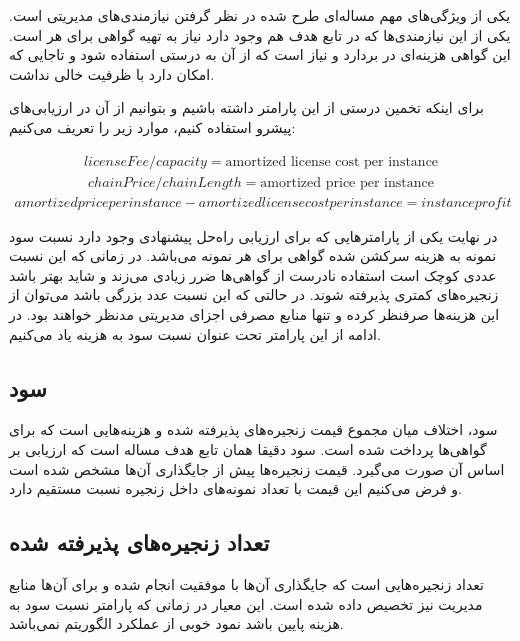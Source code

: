 یکی از ویژگی‌های مهم مساله‌ای طرح شده در نظر گرفتن نیازمندی‌های مدیریتی است. یکی از این نیازمندی‌ها که در تابع هدف هم
وجود دارد نیاز به تهیه گواهی برای هر  است.
این گواهی هزینه‌ای در بردارد و نیاز است که از آن به درستی استفاده شود
و تاجایی که امکان دارد  با ظرفیت خالی نداشت.

برای اینکه تخمین درستی از این پارامتر داشته باشیم و بتوانیم از آن در ارزیابی‌های پیشرو استفاده کنیم، موارد زیر را تعریف می‌کنیم:
    

\begin{latin}
    \begin{align}
      licenseFee / capacity = \text{amortized license cost per instance}
    \end{align}
    \begin{align}
      chainPrice / chainLength = \text{amortized price per instance}
    \end{align}
    \begin{align}
      amortized price per instance - amortized license cost per instance = instance profit 
    \end{align}
\end{latin}

در نهایت یکی از پارامترهایی که برای ارزیابی راه‌حل پیشنهادی وجود دارد
نسبت سود نمونه به هزینه سرکشن شده گواهی برای هر نمونه می‌باشد.
در زمانی که این نسبت عددی کوچک است استفاده نادرست از گواهی‌ها ضرر زیادی می‌زند و شاید بهتر باشد زنجیره‌های کمتری پذیرفته شوند.
در حالتی که این نسبت عدد بزرگی باشد می‌توان از این هزینه‌ها صرفنظر کرده و تنها منابع مصرفی اجزای مدیریتی مدنظر خواهند بود.
در ادامه از این پارامتر تحت عنوان نسبت سود به هزینه یاد می‌کنیم.

\subsection{سود}

سود، اختلاف میان مجموع قیمت زنجیره‌های پذیرفته شده و هزینه‌هایی است که برای گواهی‌ها پرداخت شده است. سود دقیقا همان تابع هدف مساله است که ارزیابی بر اساس آن صورت می‌گیرد. قیمت زنجیره‌ها پیش از جایگذاری آن‌ها مشخص شده است و فرض می‌کنیم این قیمت با تعداد نمونه‌های داخل زنجیره نسبت مستقیم دارد.

\subsection{تعداد زنجیره‌های پذیرفته شده}

تعداد زنجیره‌هایی است که جایگذاری آن‌ها با موفقیت انجام شده و برای آن‌ها منابع مدیریت نیز تخصیص داده شده است. این معیار در زمانی که پارامتر نسبت سود به هزینه پایین باشد نمود خوبی از عملکرد الگوریتم نمی‌باشد.

